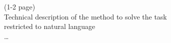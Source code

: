 (1-2 page)\\
Technical description of the method to solve the task \\
restricted to natural language\\
\dots